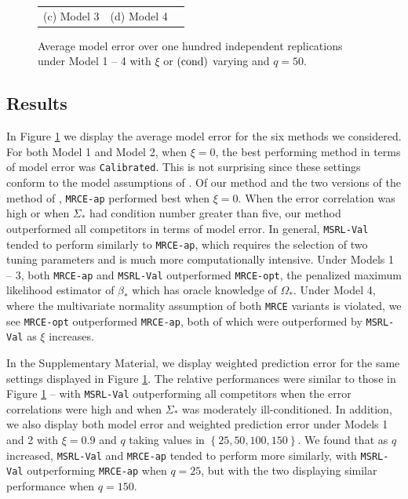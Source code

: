 \documentclass[12pt]{article}
\begin{document}
\begin{figure}[h!]
\begin{tabular}{ccc}
(c) Model 3  & (d) Model 4 & \\[6pt]
\end{tabular}
\caption{Average model error over one hundred independent replications under Model 1 -- 4 with $\xi$ or $(\rm cond)$ varying and $q=50$.}\label{fig:rho_Results}
\end{figure}

\subsection{Results}\label{subsec:Results}
In Figure \ref{fig:rho_Results} we display the average model error for the six methods we considered. For both Model 1 and Model 2, when $\xi = 0$, the best performing method in terms of model error was \texttt{Calibrated}. This is not surprising since these settings conform to the model assumptions of \citet{liu2015calibrated}. Of our method and the two versions of the method of \citet{rothman2010sparse}, \texttt{MRCE-ap} performed best when $\xi=0$. When the error correlation was high or when $\Sigma_*$ had condition number greater than five, our method outperformed all competitors in terms of model error. In general, \texttt{MSRL-Val} tended to perform similarly to \texttt{MRCE-ap}, which requires the selection of two tuning parameters and is much more computationally intensive. Under Models 1 -- 3, both \texttt{MRCE-ap} and \texttt{MSRL-Val} outperformed \texttt{MRCE-opt}, the penalized maximum likelihood estimator of $\beta_*$ which has oracle knowledge of $\Omega_*$. Under Model 4, where the multivariate normality assumption of both \texttt{MRCE} variants is violated, we see \texttt{MRCE-opt} outperformed \texttt{MRCE-ap}, both of which were outperformed by \texttt{MSRL-Val} as $\xi$ increases. 


In the Supplementary Material, we display weighted prediction error for the same settings displayed in Figure \ref{fig:rho_Results}. The relative performances were similar to those in Figure \ref{fig:rho_Results} -- with \texttt{MSRL-Val} outperforming all competitors when the error correlations were high and when $\Sigma_*$ was moderately ill-conditioned. In addition, we also display both model error and weighted prediction error under Models 1 and 2 with $\xi = 0.9$ and $q$ taking values in $\left\{25, 50, 100, 150\right\}$. We found that as $q$ increased, \texttt{MSRL-Val} and \texttt{MRCE-ap} tended to perform more similarly, with \texttt{MSRL-Val} outperforming \texttt{MRCE-ap} when $q = 25$, but with the two displaying similar performance when $q = 150$.
\end{document}
